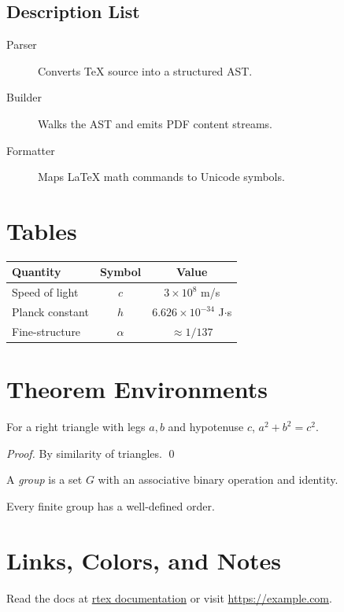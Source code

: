 \documentclass{article}
\begin{document}
\subsection{Description List}
\begin{description}
    \item[Parser] Converts TeX source into a structured AST.
    \item[Builder] Walks the AST and emits PDF content streams.
    \item[Formatter] Maps LaTeX math commands to Unicode symbols.
\end{description}

\section{Tables}
\begin{tabular}{lcc}
\hline
Quantity & Symbol & Value \\
\hline
Speed of light & $c$ & $3 \times 10^8$ m/s \\
Planck constant & $h$ & $6.626 \times 10^{-34}$ J$\cdot$s \\
Fine-structure & $\alpha$ & $\approx 1/137$ \\
\hline
\end{tabular}

\section{Theorem Environments}
\begin{theorem}[Pythagoras]
For a right triangle with legs $a, b$ and hypotenuse $c$, $a^2 + b^2 = c^2$.
\end{theorem}

\begin{proof}
By similarity of triangles. \qed
\end{proof}

\begin{definition}
A \emph{group} is a set $G$ with an associative binary operation and identity.
\end{definition}

\begin{lemma}
Every finite group has a well-defined order.
\end{lemma}

\section{Links, Colors, and Notes}
Read the docs at \href{https://example.com/rtex}{rtex documentation} or visit
\url{https://example.com}.
\end{document}
